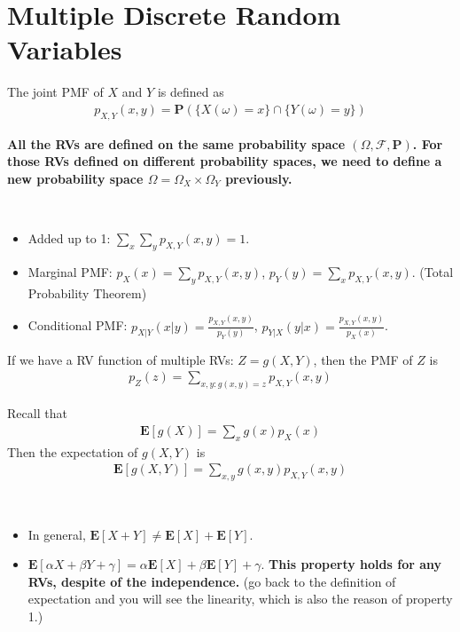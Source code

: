 \section{Multiple Discrete Random Variables}
\begin{definition}
    The joint PMF of $X$ and $Y$ is defined as
    \begin{align}
        p_{X, Y}(x, y) = \mathbf{P}(\{X(\omega) = x\} \cap \{Y(\omega) = y\})
    \end{align}
\end{definition}
\begin{remark}
    \textbf{All the RVs are defined on the same probability space $(\Omega, \mathcal{F}, \mathbf{P})$. For those RVs defined on different probability spaces, we need to define a new probability space $\Omega = \Omega_X \times \Omega_Y$ previously.}
\end{remark}
\begin{property} ~
    \begin{itemize}
        \item Added up to 1: $\sum_x \sum_y p_{X, Y}(x, y) = 1$.
        \item Marginal PMF: $p_{X}(x) = \sum_y p_{X, Y}(x, y)$, $p_{Y}(y) = \sum_x p_{X, Y}(x, y)$. (Total Probability Theorem)
        \item Conditional PMF: $p_{X|Y}(x|y) = \frac{p_{X, Y}(x, y)}{p_{Y}(y)}$, $p_{Y|X}(y|x) = \frac{p_{X, Y}(x, y)}{p_{X}(x)}$.
    \end{itemize}
\end{property}
If we have a RV function of multiple RVs: $Z = g(X, Y)$, then the PMF of $Z$ is
\begin{align}
    p_{Z}(z) = \sum_{x, y: g(x, y) = z} p_{X, Y}(x, y)
\end{align}
\begin{definition}
    Recall that 
    \begin{align*}
        \mathbf{E}[g(X)] = \sum_{x} g(x) p_{X}(x)
    \end{align*}
    Then the expectation of $g(X, Y)$ is
    \begin{align}
        \mathbf{E}[g(X, Y)] = \sum_{x, y} g(x, y) p_{X, Y}(x, y)
    \end{align}
\end{definition}
\begin{property} ~
    \begin{itemize}
        \item In general, $\mathbf{E}[X + Y] \neq \mathbf{E}[X] + \mathbf{E}[Y]$.
        \item $\mathbf{E}[\alpha X + \beta Y + \gamma] = \alpha \mathbf{E}[X] + \beta \mathbf{E}[Y] + \gamma$. \textbf{This property holds for any RVs, despite of the independence.} (go back to the definition of expectation and you will see the linearity, which is also the reason of property 1.)
    \end{itemize}
\end{property}
